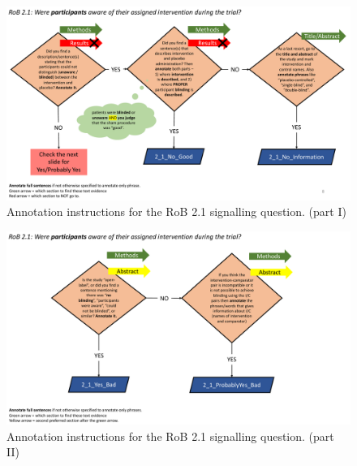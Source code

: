 \documentclass[sn-mathphys,Numbered]{sn-jnl}%
\begin{document}

%
%
%
\begin{figure}[hbt]
    \centering
    \includegraphics[width=\textwidth]{figures/2_1_1.pdf}
    \caption{Annotation instructions for the RoB 2.1 signalling question. (part I)}
    \label{fig:2_1}
\end{figure}
\begin{figure}[hbt]
    \centering
    \includegraphics[width=\textwidth]{figures/2_1.pdf}
    \caption{Annotation instructions for the RoB 2.1 signalling question. (part II)}
    \label{fig:2_1_1}
\end{figure}
%
%
%
\end{document}
